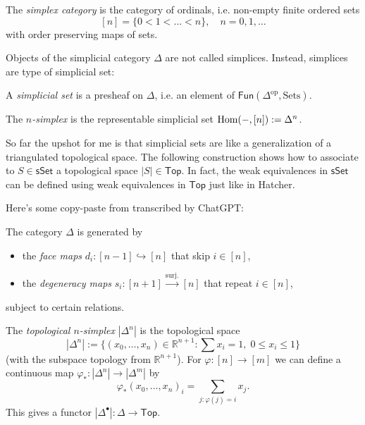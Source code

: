 \begin{definition}
\label{definition-simplex}
The {\it simplex category} is the category of ordinals, i.e.
non-empty finite ordered sets
$$
[n]=\{0<1<\ldots<n\}, \quad n=0,1,\ldots
$$
with order preserving maps of sets.
\end{definition}

Objects of the simplicial category $\Delta$ are not called simplices.
Instead, simplices are type of simplicial set:

\begin{definition}
\label{definition-simplicial-set}
A {\it simplicial set} is a presheaf on $\Delta$, i.e.
an element of $\mathsf{Fun}(\Delta^{\text{op}},\text{Sets})$.
\end{definition}

\begin{definition}
\label{definition-simplex}
The {\it $n$-simplex} is the 
representable simplicial set $\mathop{\mathrm{Hom}}\nolimits(-,[n]):=\Delta^n$.
\end{definition}

So far the upshot for me is that simplicial sets
are like a generalization of a triangulated
topological space. The following construction
shows how to associate to $S \in \mathsf{sSet}$
a topological space $|S|\in \mathsf{Top}$.
In fact, the weak equivalences in $\mathsf{sSet}$ 
can be defined using weak equivalences
in $\mathsf{Top}$ just like in Hatcher.

\medskip\noindent
Here's some copy-paste from \cite[Chapter 1]{rune}
transcribed by ChatGPT:

The category $\Delta$ is generated by
\begin{itemize}
\item the \emph{face maps} $d_i : [n-1] \hookrightarrow [n]$ that skip $i \in [n]$,
\item the \emph{degeneracy maps} $s_i : [n+1] \xrightarrow{\text{surj.}} [n]$ 
that repeat $i \in [n]$,
\end{itemize}
subject to certain relations.

\begin{definition}
\label{definition-topological-n-simplex}
\begin{reference}
\cite[Definition 1.4.2]{rune}
\end{reference}
The {\it topological $n$-simplex} $|\Delta^n|$ is the topological space
\[
|\Delta^n| := \{(x_0,\ldots,x_n) \in \mathbb{R}^{n+1} : \sum x_i = 1,\; 0 \leq x_i \leq 1\}
\]
(with the subspace topology from $\mathbb{R}^{n+1}$).
For $\varphi:[n]\to[m]$ we can define a continuous map 
$\varphi_* : |\Delta^n| \to |\Delta^m|$ by
$$
\varphi_*(x_0,\ldots,x_n)_i = \sum_{j:\varphi(j)=i} x_j.
$$
This gives a functor $|\Delta^\bullet| : \Delta \to \mathsf{Top}$.
\end{definition}

